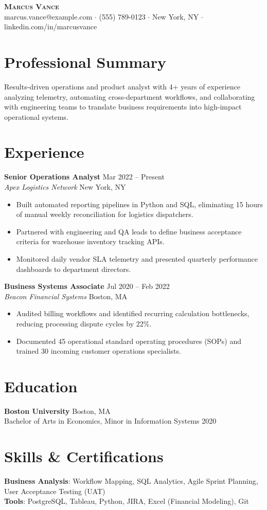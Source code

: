 \documentclass[letterpaper,10pt]{article}
\newcommand{\resumeItem}[1]{\item\small{{#1}}}
\begin{document}
\begin{center}
    {\LARGE \scshape \textbf{Marcus Vance}} \\ \vspace{4pt}
    \small marcus.vance@example.com $\cdot$ (555) 789-0123 $\cdot$ New York, NY $\cdot$ linkedin.com/in/marcusvance
\end{center}

\section{Professional Summary}
Results-driven operations and product analyst with 4+ years of experience analyzing telemetry, automating cross-department workflows, and collaborating with engineering teams to translate business requirements into high-impact operational systems.

\section{Experience}
\textbf{Senior Operations Analyst} \hfill Mar 2022 -- Present \\
\textit{Apex Logistics Network} \hfill New York, NY
\begin{itemize}
    \resumeItem{Built automated reporting pipelines in Python and SQL, eliminating 15 hours of manual weekly reconciliation for logistics dispatchers.}
    \resumeItem{Partnered with engineering and QA leads to define business acceptance criteria for warehouse inventory tracking APIs.}
    \resumeItem{Monitored daily vendor SLA telemetry and presented quarterly performance dashboards to department directors.}
\end{itemize}

\vspace{6pt}
\textbf{Business Systems Associate} \hfill Jul 2020 -- Feb 2022 \\
\textit{Beacon Financial Systems} \hfill Boston, MA
\begin{itemize}
    \resumeItem{Audited billing workflows and identified recurring calculation bottlenecks, reducing processing dispute cycles by 22\%.}
    \resumeItem{Documented 45 operational standard operating procedures (SOPs) and trained 30 incoming customer operations specialists.}
\end{itemize}

\section{Education}
\textbf{Boston University} \hfill Boston, MA \\
Bachelor of Arts in Economics, Minor in Information Systems \hfill 2020

\section{Skills \& Certifications}
\textbf{Business Analysis}: Workflow Mapping, SQL Analytics, Agile Sprint Planning, User Acceptance Testing (UAT) \\
\textbf{Tools}: PostgreSQL, Tableau, Python, JIRA, Excel (Financial Modeling), Git
\end{document}
